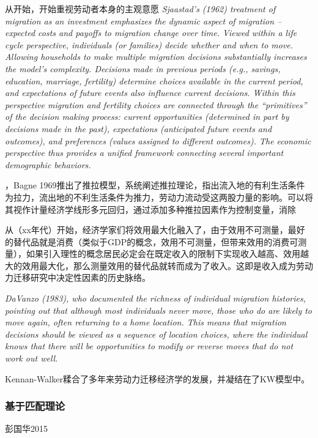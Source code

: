 \documentclass[a4paper,10pt]{article}
\begin{document}
从\cite{sjaastadCostsReturnsHuman1962}开始，开始重视劳动者本身的主观意愿
\textit{Sjaastad’s (1962) treatment of migration as an investment emphasizes the dynamic  aspect of migration – expected costs and payoffs to migration change over time. Viewed  within a life cycle perspective, individuals (or families) decide whether and when to  move. Allowing households to make multiple migration decisions substantially increases the model’s complexity. Decisions made in previous periods (e.g., savings, education,  marriage, fertility) determine choices available in the current period, and expectations  of future events also influence current decisions. Within this perspective migration and  fertility choices are connected through the “primitives” of the decision making process:  current opportunities (determined in part by decisions made in the past), expectations (anticipated future events and outcomes), and preferences (values assigned to different outcomes). The economic perspective thus provides a unified framework connecting several important demographic behaviors.}


\cite{leeTheoryMigration1966}，Bagne 1969推出了推拉模型，系统阐述推拉理论，指出流入地的有利生活条件为拉力，流出地的不利生活条件为推力，劳动力流动受这两股力量的影响。可以将其视作计量经济学线形多元回归，通过添加多种推拉因素作为控制变量，消除

从（xx年代）开始，经济学家们将效用最大化融入了，由于效用不可测量，最好的替代品就是消费（类似于GDP的概念，效用不可测量，但带来效用的消费可测量），如果引入理性的概念居民必定会在既定收入的限制下实现收入越高、效用越大的效用最大化，那么测量效用的替代品就转而成为了收入。这即是收入成为劳动力迁移研究中决定性因素的历史脉络。


\textit{DaVanzo (1983), who documented the richness  of individual migration histories, pointing out that although most individuals never move,  those who do are likely to move again, often returning to a home location. This means  that migration decisions should be viewed as a sequence of location choices, where the  individual knows that there will be opportunities to modify or reverse moves that do not  work out well.}

Kennan-Walker糅合了多年来劳动力迁移经济学的发展，并凝结在了KW模型中。

\subsubsection{基于匹配理论}
彭国华2015\cite{PengGuoHuaJiShuNengLiPiPeiLaoDongLiLiuDongYuZhongGuoDiQuChaiJu2015}
\end{document}
